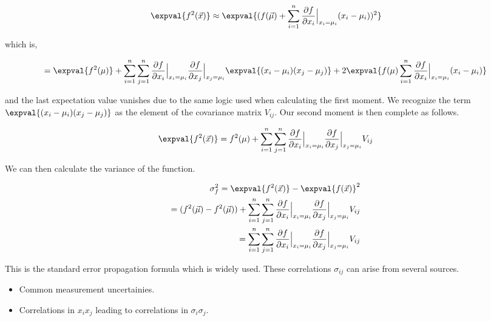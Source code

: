 \begin{equation}
        \expval{f^2(\vec{x})} \approx \expval{ (f(\vec{\mu}) + \sum_{i=1}^{n} \frac{\partial f}{\partial x_i} \Bigr|_{x_i = \mu_i} (x_i - \mu_i))^2 }
\end{equation}

which is, 

\begin{equation}
        = \expval{f^2(\mu)} + \sum_{i=1}^{n} \sum_{j=1}^{n} \frac{\partial f}{\partial x_i} \Bigr|_{x_i = \mu_i} \frac{\partial f}{\partial x_j} \Bigr|_{x_j = \mu_i} \expval{(x_i - \mu_i)(x_j - \mu_j)} + 2 \expval{f(\mu) \sum_{i=1}^{n} \frac{\partial f}{\partial x_i} \Bigr|_{x_i = \mu_i} (x_i-\mu_i)}
\end{equation}

and the last expectation value vanishes due to the same logic used when calculating the first moment.  We recognize the term $\expval{(x_i - \mu_i)(x_j - \mu_j)}$ as the element of the covariance matrix $V_{ij}$.  Our second moment is then complete as follows.

\begin{equation}
        \expval{f^2(\vec{x})}  = f^2(\mu) + \sum_{i=1}^{n} \sum_{j=1}^{n} \frac{\partial f}{\partial x_i} \Bigr|_{x_i = \mu_i} \frac{\partial f}{\partial x_j} \Bigr|_{x_j = \mu_i} V_{ij}
\end{equation}

We can then calculate the variance of the function.

\begin{align} 
    \sigma_{f}^2 = \expval{f^2(\vec{x})} - \expval{f(\vec{x})}^2 \\ 
    = (f^2(\vec{\mu}) - f^2(\vec{\mu})) + \sum_{i=1}^{n} \sum_{j=1}^{n} \frac{\partial f}{\partial x_i} \Bigr|_{x_i = \mu_i} \frac{\partial f}{\partial x_j} \Bigr|_{x_j = \mu_i} V_{ij} \\
    = \sum_{i=1}^{n} \sum_{j=1}^{n} \frac{\partial f}{\partial x_i} \Bigr|_{x_i = \mu_i} \frac{\partial f}{\partial x_j} \Bigr|_{x_j = \mu_i} V_{ij} 
\end{align}

This is the standard error propagation formula which is widely used.  These correlations $\sigma_{ij}$ can arise from several sources.

\begin{itemize}
    \item{Common measurement uncertainies.}
    \item{Correlations in $x_i x_j$ leading to correlations in $\sigma_i \sigma_j$.}
\end{itemize}
